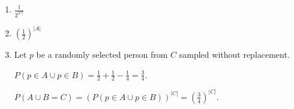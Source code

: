 \begin{enumerate}[label=(\alph*)]

\item $\frac{1}{2^{|C|}}$

\item $\left(\frac{1}{2}\right)^{|A|}$

\item Let $p$ be a randomly selected person from $C$ sampled without
replacement.

$P(p \in A \cup p \in B) = \frac{1}{2} + \frac{1}{2} - \frac{1}{4} = \frac{3}
{4}$.

$P(A \cup B = C) = (P(p \in A \cup p \in B))^{|C|} = \left(\frac{3}{4}\right)^
{|C|}.$
\end{enumerate}